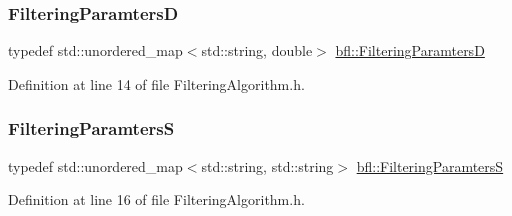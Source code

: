 \subsubsection{\texorpdfstring{Filtering\+ParamtersD}{FilteringParamtersD}}
{\footnotesize\ttfamily typedef std\+::unordered\+\_\+map$<$std\+::string, double$>$ \mbox{\hyperlink{namespacebfl_aeab050cf5b080512a10c1fec72921f0c}{bfl\+::\+Filtering\+ParamtersD}}}



Definition at line 14 of file Filtering\+Algorithm.\+h.

\mbox{\label{namespacebfl_aaa1677d9f16c84aac08a5a0bf36a0fa6}} 
\subsubsection{\texorpdfstring{Filtering\+ParamtersS}{FilteringParamtersS}}
{\footnotesize\ttfamily typedef std\+::unordered\+\_\+map$<$std\+::string, std\+::string$>$ \mbox{\hyperlink{namespacebfl_aaa1677d9f16c84aac08a5a0bf36a0fa6}{bfl\+::\+Filtering\+ParamtersS}}}



Definition at line 16 of file Filtering\+Algorithm.\+h.

